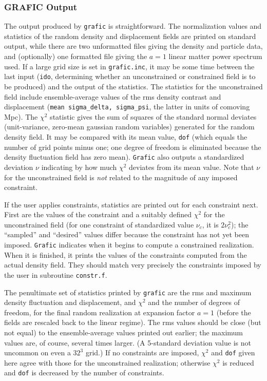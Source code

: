 \subsubsection{GRAFIC Output}

The output produced by {\tt grafic} is straightforward.  The normalization
values and statistics of the random density and displacement fields are
printed on standard output, while there are two unformatted files giving the
density and particle data, and (optionally) one formatted file giving the
$a=1$ linear matter power spectrum used.  If a large grid size is set in
{\tt grafic.inc}, it may be some time between the last input ({\tt ido},
determining whether an unconstrained or constrained field is to be produced)
and the output of the statistics.  The statistics for the unconstrained
field include ensemble-average values of the rms density contrast and
displacement ({\tt mean sigma\_delta, sigma\_psi}, the latter in units of
comoving Mpc).  The $\chi^2$ statistic gives the sum of squares of the
standard normal deviates (unit-variance, zero-mean gaussian random variables)
generated for the random density field.  It may be compared with its mean
value, {\tt dof} (which equals the number of grid points minus one; one degree
of freedom is eliminated because the density fluctuation field has zero
mean).  {\tt Grafic} also outputs a standardized deviation $\nu$ indicating
by how much $\chi^2$ deviates from its mean value.  Note that $\nu$ for
the unconstrained field is {\it not} related to the magnitude of any imposed
constraint.

If the user applies constraints, statistics are printed out for each
constraint next.  First are the values of the constraint and a
suitably defined $\chi^2$ for the unconstrained field  (for one
constraint of standardized value $\nu_c$, it is $2\nu_c^2$); the
``sampled'' and ``desired'' values differ because the constraint has not
yet been imposed.  {\tt Grafic} indicates when it begins to compute a
constrained realization.  When it is finished, it prints the values of
the constraints computed from the actual density field.  They should
match very precisely the constraints imposed by the user in subroutine
{\tt constr.f}.

The penultimate set of statistics printed by {\tt grafic} are the rms and
maximum density fluctuation and displacement, and $\chi^2$ and the number
of degrees of freedom, for the final random realization at expansion
factor $a=1$ (before the fields are rescaled back to the linear regime).
The rms values should be close (but not equal) to the ensemble-average
values printed out earlier; the maximum values are, of course, several
times larger.  (A 5-standard deviation value is not uncommon on even a
$32^3$ grid.)  If no constraints are imposed, $\chi^2$ and {\tt dof} given
here agree with those for the unconstrained realization; otherwise $\chi^2$
is reduced and {\tt dof} is decreased by the number of constraints.

